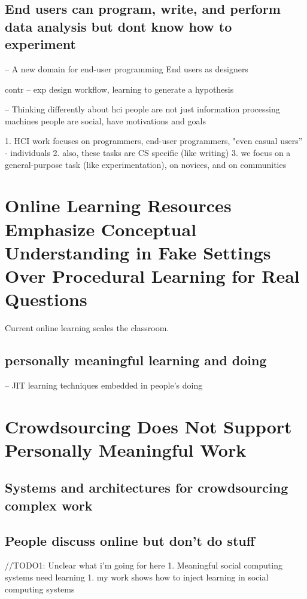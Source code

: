 \subsection{End users can program, write, and perform data analysis but dont know how to experiment}
-- A new domain for end-user programming 
End users as designers

contr -- exp design workflow, learning to generate a hypothesis

-- Thinking differently about hci 
  people are not just information processing machines
  people are social, have motivations and goals

1. HCI work focuses on programmers, end-user programmers, "even casual users” - individuals
2. also, these tasks are CS specific (like writing)
3. we focus on a general-purpose task (like experimentation), on novices, and on communities


\section{Online Learning Resources Emphasize Conceptual Understanding in Fake Settings Over Procedural Learning for Real Questions}

Current online learning scales the classroom.

\subsection{personally meaningful learning and doing}
-- JIT learning techniques embedded in people’s doing

\section{Crowdsourcing Does Not Support Personally Meaningful Work}


\subsection{Systems and architectures for crowdsourcing complex work}


\subsection{People discuss online but don't do stuff}
//TODO1: Unclear what i'm going for here
1. Meaningful social computing systems need learning
    1. my work shows how to inject learning in social computing systems

